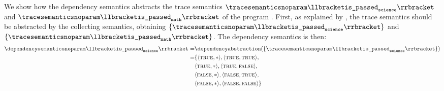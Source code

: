 \begin{example}
  We show how the dependency semantics abstracts the trace semantics $\tracesemanticsnoparam\semanticsof{\texttt{is\_passed}_\texttt{science}}$ and $\tracesemanticsnoparam\semanticsof{\texttt{is\_passed}_\texttt{math}}$ of the program .
  First, as explained by , the trace semantics should be abstracted by the collecting semantics, obtaining $\{\tracesemanticsnoparam\semanticsof{\texttt{is\_passed}_\texttt{science}}\}$ and
  $\{\tracesemanticsnoparam\semanticsof{\texttt{is\_passed}_\texttt{math}}\}$.
  The dependency semantics is then:
  \begin{align*}
     \dependencysemanticsnoparam\semanticsof{\texttt{is\_passed}_\texttt{science}}
    = &\dependencyabstraction(\{\tracesemanticsnoparam\semanticsof{\texttt{is\_passed}_\texttt{science}}\}) \\
     = &\{ \tuple\true\anyvalue, \tuple\true\true, \\
      & \tuple\true\anyvalue, \tuple\true\false, \\
      & \tuple\false\anyvalue, \tuple\false\true, \\
      & \tuple\false\anyvalue, \tuple\false\false
    \}
    \\

\end{align*}
\end{example}
